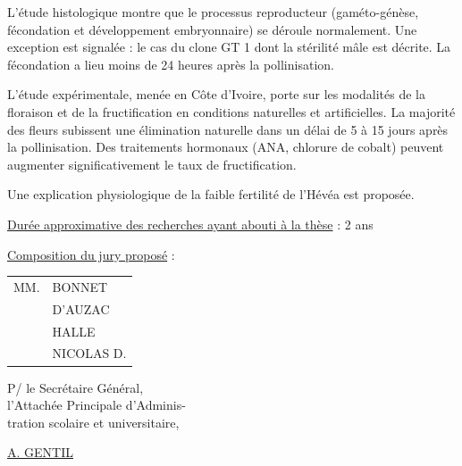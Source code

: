 L'étude histologique montre que le processus reproducteur (gaméto-génèse, fécondation et développement embryonnaire) se déroule normalement. Une exception est signalée : le cas du clone GT 1 dont la stérilité mâle est décrite. La fécondation a lieu moins de 24 heures après la pollinisation.

L'étude expérimentale, menée en Côte d'Ivoire, porte sur les modalités de la floraison et de la fructification en conditions naturelles et artificielles. La majorité des fleurs subissent une élimination naturelle dans un délai de 5 à 15 jours après la pollinisation. Des traitements hormonaux (ANA, chlorure de cobalt) peuvent augmenter significativement le taux de fructification.

Une explication physiologique de la faible fertilité de l'Hévéa est proposée.

\uline{Durée approximative des recherches ayant abouti à la thèse} : 2 ans

\uline{Composition du jury proposé} : \begin{tabular}[t]{ll}
MM. & BONNET\\
& D'AUZAC\\
& HALLE\\
& NICOLAS D.
\end{tabular}

\begin{flushright}
P/ le Secrétaire Général,\\
l'Attachée Principale d'Adminis-\\
tration scolaire et universitaire,


\uline{A. GENTIL}
\end{flushright}


